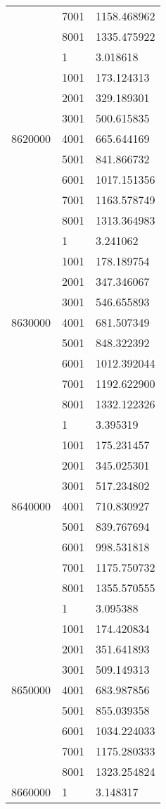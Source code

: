 \begin{table}[htb!]
\begin{tabular}{lll}
 & 7001 & 1158.468962 \\
 & 8001 & 1335.475922 \\
\multirow[c]{9}{*}{8620000} & 1 & 3.018618 \\
 & 1001 & 173.124313 \\
 & 2001 & 329.189301 \\
 & 3001 & 500.615835 \\
 & 4001 & 665.644169 \\
 & 5001 & 841.866732 \\
 & 6001 & 1017.151356 \\
 & 7001 & 1163.578749 \\
 & 8001 & 1313.364983 \\
\multirow[c]{9}{*}{8630000} & 1 & 3.241062 \\
 & 1001 & 178.189754 \\
 & 2001 & 347.346067 \\
 & 3001 & 546.655893 \\
 & 4001 & 681.507349 \\
 & 5001 & 848.322392 \\
 & 6001 & 1012.392044 \\
 & 7001 & 1192.622900 \\
 & 8001 & 1332.122326 \\
\multirow[c]{9}{*}{8640000} & 1 & 3.395319 \\
 & 1001 & 175.231457 \\
 & 2001 & 345.025301 \\
 & 3001 & 517.234802 \\
 & 4001 & 710.830927 \\
 & 5001 & 839.767694 \\
 & 6001 & 998.531818 \\
 & 7001 & 1175.750732 \\
 & 8001 & 1355.570555 \\
\multirow[c]{9}{*}{8650000} & 1 & 3.095388 \\
 & 1001 & 174.420834 \\
 & 2001 & 351.641893 \\
 & 3001 & 509.149313 \\
 & 4001 & 683.987856 \\
 & 5001 & 855.039358 \\
 & 6001 & 1034.224033 \\
 & 7001 & 1175.280333 \\
 & 8001 & 1323.254824 \\
\multirow[c]{9}{*}{8660000} & 1 & 3.148317 \\

\end{tabular}
\end{table}
